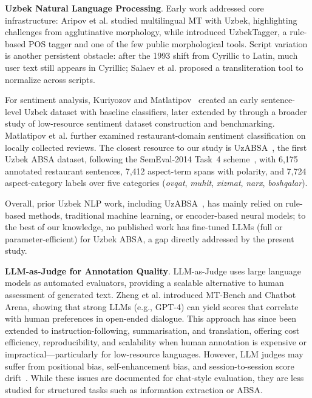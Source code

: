 \documentclass[computers,article,submit,pdftex,moreauthors]{Definitions/mdpi}
\begin{document}
\textbf{Uzbek Natural Language Processing}. Early work addressed core infrastructure: Aripov et al. \cite{10.1007/978-3-031-05328-3_6} studied multilingual MT with Uzbek, highlighting challenges from agglutinative morphology, while \cite{sharipov-et-all,sharipov2023uzbektagger} introduced UzbekTagger, a rule-based POS tagger and one of the few public morphological tools. Script variation is another persistent obstacle: after the 1993 shift from Cyrillic to Latin, much user text still appears in Cyrillic; Salaev et al.\cite{Salaev2024} proposed a transliteration tool to normalize across scripts.

For sentiment analysis, Kuriyozov and Matlatipov~\cite{kuriyozov2019building} created an early sentence-level Uzbek dataset with baseline classifiers, later extended by \cite{kuriyozov2022construction} through a broader study of low-resource sentiment dataset construction and benchmarking. Matlatipov et al.\cite{Matlatipov2009,uzbekendingssanat} further examined restaurant-domain sentiment classification on locally collected reviews. The closest resource to our study is UzABSA~\cite{matlatipov2024uzabsa}, the first Uzbek ABSA dataset, following the SemEval-2014 Task~4 scheme~\cite{pontiki-etal-2014-semeval}, with 6{,}175 annotated restaurant sentences, 7{,}412 aspect-term spans with polarity, and 7{,}724 aspect-category labels over five categories (\textit{ovqat}, \textit{muhit}, \textit{xizmat}, \textit{narx}, \textit{boshqalar}).

Overall, prior Uzbek NLP work, including UzABSA~\cite{matlatipov2024uzabsa}, has mainly relied on rule-based methods, traditional machine learning, or encoder-based neural models; to the best of our knowledge, no published work has fine-tuned LLMs (full or parameter-efficient) for Uzbek ABSA, a gap directly addressed by the present study.%

\label{sec:rw_judge}
\textbf{LLM-as-Judge for Annotation Quality}. LLM-as-Judge uses large language models as automated evaluators, providing a scalable alternative to human assessment of generated text. Zheng et al.\cite{10.5555/3666122.3668142} introduced MT-Bench and Chatbot Arena, showing that strong LLMs (e.g., GPT-4) can yield scores that correlate with human preferences in open-ended dialogue. This approach has since been extended to instruction-following, summarisation, and translation, offering cost efficiency, reproducibility, and scalability when human annotation is expensive or impractical---particularly for low-resource languages. However, LLM judges may suffer from positional bias, self-enhancement bias, and session-to-session score drift~\cite{2506.22316}. While these issues are documented for chat-style evaluation, they are less studied for structured tasks such as information extraction or ABSA.
\end{document}
